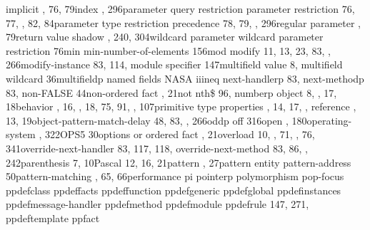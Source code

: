 \documentclass[letterpaper,10pt,english]{sphinxmanual}
\begin{document}
implicit , 76, 79index , 296parameter query
restriction parameter restriction 76, 77, , 82,
84parameter type restriction precedence 78, 79, ,
296regular parameter , 79return value shadow , 240,
304wildcard parameter wildcard parameter restriction 76min
min-number-of-elements 156mod modify 11, 13, 23, 83,
, 266modify-instance 83, 114, module specifier
147multifield value 8, multifield wildcard 36multifieldp
named fields NASA iiineq next-handlerp 83,
next-methodp 83, non-FALSE 44non-ordered fact ,
21not nth\$ 96, numberp object 8, , 17,
18behavior , 16, , 18, 75, 91, , 107primitive type
properties , 14, 17, , reference , 13,
19object-pattern-match-delay 48, 83, , 266oddp off
316open , 180operating-system , 322OPS5 30options
or ordered fact , 21overload 10, , 71,
, 76, 341override-next-handler 83, 117, 118,
override-next-method 83, 86, , 242parenthesis 7,
10Pascal 12, 16, 21pattern , 27pattern entity
pattern-address 50pattern-matching , 65, 66performance
pi pointerp polymorphism pop-focus
ppdefclass ppdeffacts ppdeffunction
ppdefgeneric ppdefglobal ppdefinstances
ppdefmessage-handler ppdefmethod ppdefmodule
ppdefrule 147, 271, ppdeftemplate ppfact
\end{document}
